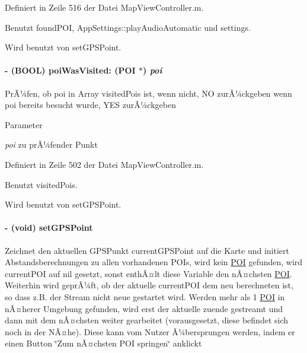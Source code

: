 Definiert in Zeile 516 der Datei MapViewController.m.

Benutzt foundPOI, AppSettings::playAudioAutomatic und settings.

Wird benutzt von setGPSPoint.\hypertarget{interface_map_view_controller_aa06b8c96774de56d356c67bafb964ced}{
\paragraph[{poiWasVisited:}]{\setlength{\rightskip}{0pt plus 5cm}-\/ (BOOL) poiWasVisited: ({\bf POI} $\ast$) {\em poi}}\hfill}
\label{interface_map_view_controller_aa06b8c96774de56d356c67bafb964ced}
PrÃ¼fen, ob poi in Array visitedPois ist, wenn nicht, NO zurÃ¼ckgeben wenn poi bereits besucht wurde, YES zurÃ¼ckgeben 
\begin{DoxyParams}{Parameter}
\item[{\em poi}]zu prÃ¼fender Punkt \end{DoxyParams}


Definiert in Zeile 502 der Datei MapViewController.m.

Benutzt visitedPois.

Wird benutzt von setGPSPoint.\hypertarget{interface_map_view_controller_a95b915b0cb182a6117a9ee23f5b2ede8}{
\paragraph[{setGPSPoint}]{\setlength{\rightskip}{0pt plus 5cm}-\/ (void) setGPSPoint }\hfill}
\label{interface_map_view_controller_a95b915b0cb182a6117a9ee23f5b2ede8}
Zeichnet den aktuellen GPSPunkt currentGPSPoint auf die Karte und initiert Abstandsberechnungen zu allen vorhandenen POIs, wird kein \hyperlink{interface_p_o_i}{POI} gefunden, wird currentPOI auf nil gesetzt, sonst enthÃ¤lt diese Variable den nÃ¤chsten \hyperlink{interface_p_o_i}{POI}. Weiterhin wird geprÃ¼ft, ob der aktuelle currentPOI dem neu berechneten ist, so dass z.B. der Stream nicht neue gestartet wird. Werden mehr als 1 \hyperlink{interface_p_o_i}{POI} in nÃ¤herer Umgebung gefunden, wird erst der aktuelle zuende gestreamt und dann mit dem nÃ¤chsten weiter gearbeitet (vorausgesetzt, diese befindet sich noch in der NÃ¤he). Diese kann vom Nutzer Ã¼bersprungen werden, indem er einen Button \char`\"{}Zum nÃ¤chsten POI springen\char`\"{} anklickt 


